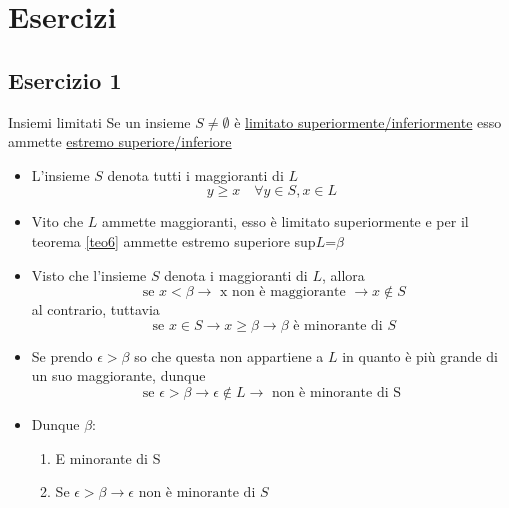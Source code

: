 \section{Esercizi}
\subsection{Esercizio 1}

\begin{teorema}{Insiemi limitati}
	Se un insieme $S \neq \emptyset$ è \underline{limitato superiormente/inferiormente} esso ammette \underline{estremo superiore/inferiore}
\end{teorema}

\label{teo6}
\begin{itemize}
	\item L'insieme $S$ denota tutti i maggioranti di $L$
	      \[
		      y \ge x \quad \forall y  \in S, x  \in L
	      \]
	\item Vito che $L$ ammette maggioranti, esso è limitato superiormente e per il teorema \ref{teo6} ammette estremo superiore sup$L$=$\beta$
	\item Visto che l'insieme $S$ denota i maggioranti di $L$, allora \[
		      \text{ se } x < \beta \rightarrow \text{ x non è maggiorante } \rightarrow x  \not\in S
	      \]
	      al contrario, tuttavia
	      \[
		      \text{ se } x  \in S \rightarrow x \ge \beta \rightarrow \beta\text{ è minorante di } S
	      \]
	\item Se prendo $\epsilon > \beta$ so che questa non appartiene a $L $ in quanto è più grande di un suo maggiorante, dunque \[
		      \text{ se  } \epsilon > \beta \rightarrow \epsilon  \not\in L \rightarrow \text{ non è minorante di S }
	      \]
	\item Dunque $\beta$:
	      \begin{enumerate}
		      \item E minorante di S
		      \item Se $\epsilon > \beta \rightarrow \epsilon \text{ non è minorante di } S$
	      \end{enumerate}
\end{itemize}
